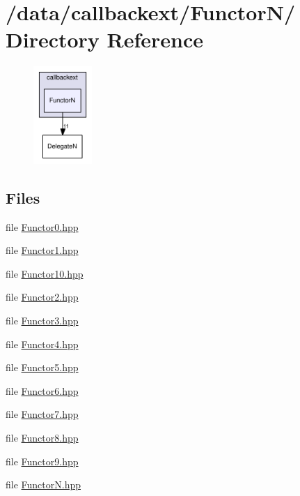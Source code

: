\hypertarget{dir_000004}{
\section{/data/callbackext/Functor\-N/ Directory Reference}
\label{dir_000004}
}


\begin{figure}[H]
\begin{center}
\leavevmode
\includegraphics[width=63pt]{dir_000004_dep}
\end{center}
\end{figure}
\subsection*{Files}
\begin{CompactItemize}
\item 
file \hyperlink{Functor0_8hpp}{Functor0.hpp}
\item 
file \hyperlink{Functor1_8hpp}{Functor1.hpp}
\item 
file \hyperlink{Functor10_8hpp}{Functor10.hpp}
\item 
file \hyperlink{Functor2_8hpp}{Functor2.hpp}
\item 
file \hyperlink{Functor3_8hpp}{Functor3.hpp}
\item 
file \hyperlink{Functor4_8hpp}{Functor4.hpp}
\item 
file \hyperlink{Functor5_8hpp}{Functor5.hpp}
\item 
file \hyperlink{Functor6_8hpp}{Functor6.hpp}
\item 
file \hyperlink{Functor7_8hpp}{Functor7.hpp}
\item 
file \hyperlink{Functor8_8hpp}{Functor8.hpp}
\item 
file \hyperlink{Functor9_8hpp}{Functor9.hpp}
\item 
file \hyperlink{FunctorN_8hpp}{Functor\-N.hpp}
\end{CompactItemize}
